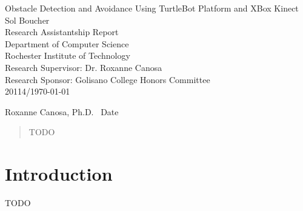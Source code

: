 \documentclass[12pt]{report}
\renewcommand{\Large}{\fontsize{18pt}{18pt}\selectfont}
\renewcommand{\large}{\fontsize{14pt}{14pt}\selectfont}
\begin{document}
\begin{titlepage}
\vspace*{\fill}
\begin{center}
{\Large Obstacle Detection and Avoidance Using TurtleBot Platform and XBox Kinect} \\
\vspace{18pt}
{\large Sol Boucher} \\
\vspace{14pt}
{\large Research Assistantship Report \\
	Department of Computer Science \\
	Rochester Institute of Technology} \\
\vspace{14pt}
Research Supervisor: Dr. Roxanne Canosa \\
Research Sponsor: Golisano College Honors Committee \\
\vspace{12pt}
20114/\today
\end{center}
\vspace{\fill}
Roxanne Canosa, Ph.D. \hrulefill\ Date \hrulefill
\end{titlepage}

\begin{abstract}
\thispagestyle{plain}
\setcounter{page}{2}
TODO
\end{abstract}

\setcounter{page}{3}
\tableofcontents
\clearpage
{}
{}
\listoffigures
\clearpage
{}
{}
\listoftables
\newpage

\section{Introduction}
TODO
\end{document}
